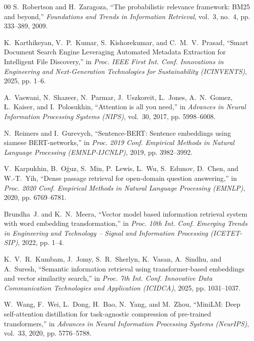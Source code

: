 \documentclass[a4paper,12pt]{article}
\begin{document}
\begin{thebibliography}{00}
S.~Robertson and H.~Zaragoza, ``The probabilistic relevance framework: BM25 and beyond,'' \emph{Foundations and Trends in Information Retrieval}, vol.~3, no.~4, pp. 333--389, 2009.

K.~Karthikeyan, V.~P.~Kumar, S.~Kishorekumar, and C.~M.~V.~Prasad, ``Smart Document Search Engine Leveraging Automated Metadata Extraction for Intelligent File Discovery,'' in \emph{Proc. IEEE First Int. Conf. Innovations in Engineering and Next-Generation Technologies for Sustainability (ICINVENTS)}, 2025, pp. 1--6.

A.~Vaswani, N.~Shazeer, N.~Parmar, J.~Uszkoreit, L.~Jones, A.~N.~Gomez, {\L}.~Kaiser, and I.~Polosukhin, ``Attention is all you need,'' in \emph{Advances in Neural Information Processing Systems (NIPS)}, vol.~30, 2017, pp. 5998--6008.

N.~Reimers and I.~Gurevych, ``Sentence-BERT: Sentence embeddings using siamese BERT-networks,'' in \emph{Proc. 2019 Conf. Empirical Methods in Natural Language Processing (EMNLP-IJCNLP)}, 2019, pp. 3982--3992.

V.~Karpukhin, B.~O{\u{g}}uz, S.~Min, P.~Lewis, L.~Wu, S.~Edunov, D.~Chen, and W.-T.~Yih, ``Dense passage retrieval for open-domain question answering,'' in \emph{Proc. 2020 Conf. Empirical Methods in Natural Language Processing (EMNLP)}, 2020, pp. 6769--6781.

Brundha~J. and K.~N.~Meera, ``Vector model based information retrieval system with word embedding transformation,'' in \emph{Proc. 10th Int. Conf. Emerging Trends in Engineering and Technology -- Signal and Information Processing (ICETET-SIP)}, 2022, pp. 1--4.

K.~V.~R.~Kumbam, J.~Jomy, S.~R.~Sherlyn, K.~Vasan, A.~Sindhu, and A.~Suresh, ``Semantic information retrieval using transformer-based embeddings and vector similarity search,'' in \emph{Proc. 7th Int. Conf. Innovative Data Communication Technologies and Application (ICIDCA)}, 2025, pp. 1031--1037.

W.~Wang, F.~Wei, L.~Dong, H.~Bao, N.~Yang, and M.~Zhou, ``MiniLM: Deep self-attention distillation for task-agnostic compression of pre-trained transformers,'' in \emph{Advances in Neural Information Processing Systems (NeurIPS)}, vol.~33, 2020, pp. 5776--5788.


\end{thebibliography}
\end{document}
